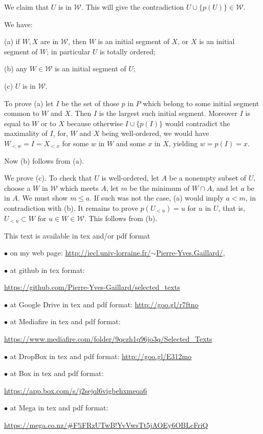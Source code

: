 \documentclass[12pt]{article}
\newcommand{\nn}{\noindent}
\begin{document}
We claim that $U$ is in $\mathcal W$. This will give the contradiction $U\cup\{p(U)\}\in\mathcal W$. 

We have: 

(a) if $W,X$ are in $\mathcal W$, then $W$ is an initial segment of $X$, or $X$ is an initial segment of $W$; in particular $U$ is totally ordered;

(b) any $W\in\mathcal W$ is an initial segment of $U$; 

(c) $U$ is in $\mathcal W$.

To prove (a) let $I$ be the set of those $p$ in $P$ which belong to some initial segment common to $W$ and $X$. Then $I$ is the largest such initial segment. Moreover $I$ is equal to $W$ or to $X$ because otherwise $I\cup\{p(I)\}$ would contradict the maximality of $I$, for, $W$ and $X$ being well-ordered, we would have $W_{<w}=I=X_{<x}$ for some $w$ in $W$ and some $x$ in $X$, yielding $w=p(I)=x$. 

Now (b) follows from (a). 

We prove (c). To check that $U$ is well-ordered, let $A$ be a nonempty subset of $U$, choose a $W$ in $\mathcal W$ which meets $A$, let $m$ be the minimum of $W\cap A$, and let $a$ be in $A$. We must show $m\le a$. If such was not the case, (a) would imply $a<m$, in contradiction with (b). It remains to prove $p(U_{<u})=u$ for $u$ in $U$, that is, $U_{<u}\subset W$ for $u\in W\in\mathcal W$. This follows from (b).

\newpage 

\nn This text is available in tex and/or pdf format 

\nn$\bullet$ on my web page: \href{http://iecl.univ-lorraine.fr/~Pierre-Yves.Gaillard/}{http://iecl.univ-lorraine.fr/$\sim$Pierre-Yves.Gaillard/}, 

\nn$\bullet$ at github in tex format:

\href{https://github.com/Pierre-Yves-Gaillard/selected_texts}{https://github.com/Pierre-Yves-Gaillard/selected\_texts} 

\nn$\bullet$ at Google Drive in tex and pdf format: \href{http://goo.gl/r7ftno}{http://goo.gl/r7ftno}

\nn$\bullet$ at Mediafire in tex and pdf format: 

\href{https://www.mediafire.com/folder/9qczh1q96jo3q/Selected_Texts}{https://www.mediafire.com/folder/9qczh1q96jo3q/Selected\_Texts} 

\nn$\bullet$ at DropBox in tex and pdf format: \href{http://goo.gl/E312mo}{http://goo.gl/E312mo}

\nn$\bullet$ at Box in tex and pdf format: 

\href{https://app.box.com/s/j2sejql6vigbehxmeqa6}{https://app.box.com/s/j2sejql6vigbehxmeqa6}

\nn$\bullet$ at Mega in tex and pdf format: 

\href{https://mega.co.nz/#F!iFRzUTwB!YvVwsTt5jAOEy6OBLcFriQ}{https://mega.co.nz/\#F!iFRzUTwB!YvVwsTt5jAOEy6OBLcFriQ}
\end{document}
